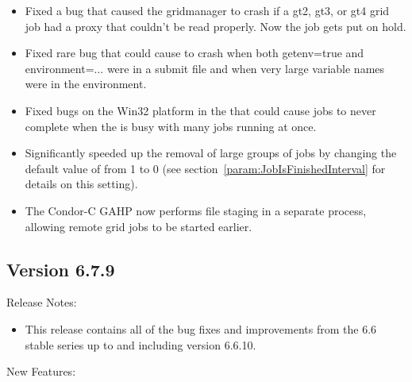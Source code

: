 \begin{itemize}

\item Fixed a bug that caused the gridmanager to crash if a gt2, gt3, or
gt4 grid job had a proxy that couldn't be read properly. Now the job gets
put on hold.

\item Fixed rare bug that could cause  to crash when
  both getenv=true and environment=... were in a submit file and when
  very large variable names were in the environment. 

\item Fixed bugs on the Win32 platform in the  that could
cause jobs to never complete when the  is busy with many jobs
running at once.

\item Significantly speeded up the removal of large groups of jobs by
changing the default value of  from 1
to 0 (see section~\ref{param:JobIsFinishedInterval} for details on this
setting).

\item The Condor-C GAHP now performs file staging in a 
separate process, allowing remote grid jobs to be started earlier.

\end{itemize}

\subsection{\label{sec:New-6-7-9}Version 6.7.9}

\noindent Release Notes:

\begin{itemize}

\item This release contains all of the bug fixes and improvements from
  the 6.6 stable series up to and including version 6.6.10.

\end{itemize}

\noindent New Features:

